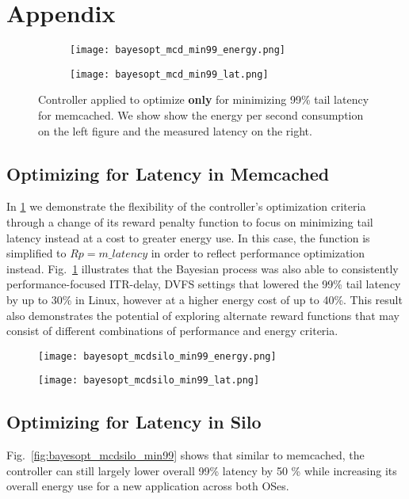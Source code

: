 \section{Appendix}
\label{sec:appendix}

\begin{figure}[!htb]
\centering
\begin{subfigure}{.45\textwidth}
  \texttt{[image: bayesopt\_mcd\_min99\_energy.png]}
\end{subfigure}
\begin{subfigure}{.45\textwidth}
  \texttt{[image: bayesopt\_mcd\_min99\_lat.png]}
\end{subfigure}
\caption{\small Controller applied to optimize \textbf{only} for minimizing 99\% tail latency for memcached. We show show the energy per second consumption on the left figure and the measured latency on the right.}
\label{fig:bayesopt_mcd_min99}
\end{figure}

\subsection{Optimizing for Latency in Memcached}

In \cref{fig:bayesopt_mcd_min99} we demonstrate the flexibility of the controller's optimization criteria through a change of its reward penalty function to focus on minimizing tail latency instead at a cost to greater energy use. In this case, the function is simplified to $Rp = m\_latency$ in order to reflect performance optimization instead. Fig.~\ref{fig:bayesopt_mcd_min99} illustrates that the Bayesian process was also able to consistently performance-focused ITR-delay,  DVFS settings that lowered the 99\% tail latency by up to 30\% in Linux, however at a higher energy cost of up to 40\%. This result also demonstrates the potential of exploring alternate reward functions that may consist of different combinations of performance and energy criteria.

\begin{figure*}[!htb]
\centering
\begin{subfigure}{.45\textwidth}
  \texttt{[image: bayesopt\_mcdsilo\_min99\_energy.png]}
\end{subfigure}%
\begin{subfigure}{.45\textwidth}
  \texttt{[image: bayesopt\_mcdsilo\_min99\_lat.png]}
\end{subfigure}
\caption{\small Controller applied to optimize \textbf{only} for minimizing 99\% tail latency in Silo. We show show the energy per second consumption on the left figure and the measured latency on the right.
}
\label{fig:bayesopt_mcdsilo_min99}
\end{figure*}

\subsection{Optimizing for Latency in Silo} Fig.~\ref{fig:bayesopt_mcdsilo_min99} shows that similar to memcached, the controller can still largely lower overall 99\% latency by 50 \% while increasing its overall energy use for a new application across both OSes.